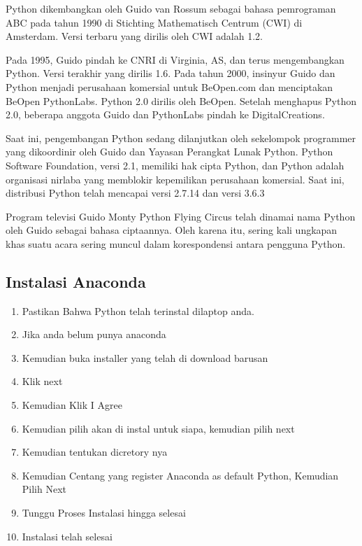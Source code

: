 Python dikembangkan oleh Guido van Rossum sebagai bahasa pemrograman ABC pada tahun 1990 di Stichting Mathematisch Centrum (CWI) di Amsterdam. Versi terbaru yang dirilis oleh CWI adalah 1.2.

Pada 1995, Guido pindah ke CNRI di Virginia, AS, dan terus mengembangkan Python. Versi terakhir yang dirilis 1.6. Pada tahun 2000, insinyur Guido dan Python menjadi perusahaan komersial untuk BeOpen.com dan menciptakan BeOpen PythonLabs. Python 2.0 dirilis oleh BeOpen. Setelah menghapus Python 2.0, beberapa anggota Guido dan PythonLabs pindah ke DigitalCreations.

Saat ini, pengembangan Python sedang dilanjutkan oleh sekelompok programmer yang dikoordinir oleh Guido dan Yayasan Perangkat Lunak Python. Python Software Foundation, versi 2.1, memiliki hak cipta Python, dan Python adalah organisasi nirlaba yang memblokir kepemilikan perusahaan komersial. Saat ini, distribusi Python telah mencapai versi 2.7.14 dan versi 3.6.3

Program televisi Guido Monty Python Flying Circus telah dinamai nama Python oleh Guido sebagai bahasa ciptaannya. Oleh karena itu, sering kali ungkapan khas suatu acara sering muncul dalam korespondensi antara pengguna Python.

\subsection{Instalasi Anaconda}
\begin{enumerate}
    \item Pastikan Bahwa Python telah terinstal dilaptop anda.
    \item Jika anda belum punya anaconda
    \item Kemudian buka installer yang telah di download barusan
    \item Klik next
    

    \item Kemudian Klik I Agree
    

    \item Kemudian pilih akan di instal untuk siapa, kemudian pilih next
    

    \item Kemudian tentukan dicretory nya
    

    \item Kemudian Centang yang register Anaconda as default Python, Kemudian Pilih Next
    

    \item Tunggu Proses Instalasi hingga selesai
    

    \item Instalasi telah selesai
	\end{enumerate}
    
